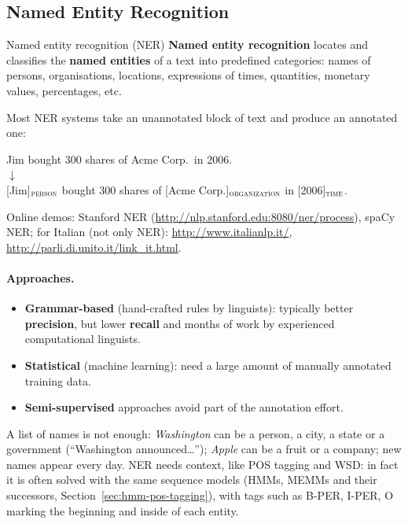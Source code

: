 \subsection{Named Entity Recognition}
\label{sec:named-entity-recognition}

\begin{nbdef}{Named entity recognition (NER)}
\textbf{Named entity recognition} locates and classifies the \textbf{named entities} of a
text into predefined categories: names of persons, organisations, locations, expressions
of times, quantities, monetary values, percentages, etc.
\end{nbdef}

Most NER systems take an unannotated block of text and produce an annotated one:
\begin{center}
Jim bought 300 shares of Acme Corp.\ in 2006.\\[3pt]
$\downarrow$\\[3pt]
[Jim]$_{\textsc{person}}$ bought 300 shares of [Acme Corp.]$_{\textsc{organization}}$ in
[2006]$_{\textsc{time}}$.
\end{center}

Online demos: Stanford NER (\url{http://nlp.stanford.edu:8080/ner/process}), spaCy NER;
for Italian (not only NER): \url{http://www.italianlp.it/},
\url{http://parli.di.unito.it/link_it.html}.

\paragraph{Approaches.}
\begin{itemize}[nosep]
  \item \textbf{Grammar-based} (hand-crafted rules by linguists): typically better
        \textbf{precision}, but lower \textbf{recall} and months of work by experienced
        computational linguists.
  \item \textbf{Statistical} (machine learning): need a large amount of manually
        annotated training data.
  \item \textbf{Semi-supervised} approaches avoid part of the annotation effort.
\end{itemize}

\begin{nbintuition}
A list of names is not enough: \emph{Washington} can be a person, a city, a state or a
government (``Washington announced\ldots''); \emph{Apple} can be a fruit or a company;
new names appear every day. NER needs context, like POS tagging and WSD: in fact it is
often solved with the same sequence models (HMMs, MEMMs and their successors,
Section~\ref{sec:hmm-pos-tagging}), with tags such as B-PER, I-PER, O marking the
beginning and inside of each entity.
\end{nbintuition}

